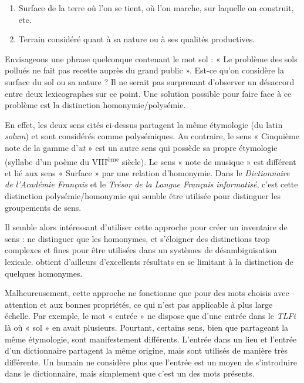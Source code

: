 \begin{enumerate}

  \item Surface de la terre où l'on se tient, où l'on marche, sur laquelle on
      construit, etc.

  \item Terrain considéré quant à sa nature ou à ses qualités productives.

\end{enumerate}

Envisageons une phrase quelconque contenant le mot sol : « Le problème des sols
pollués ne fait pas recette auprès du grand public ». Est-ce qu'on considère la
surface du sol ou sa nature ? Il ne serait pas surprenant d'observer un
désaccord entre deux lexicographes sur ce point. Une solution possible pour
faire face à ce problème est la distinction homonymie/polysémie.

En effet, les deux sens cités ci-dessus partagent la même étymologie (du latin
\textit{solum}) et sont considérés comme polysémiques. Au contraire, le sens «
Cinquième note de la gamme d'\textit{ut} » est un autre sens qui possède sa
propre étymologie (syllabe d'un poème du VIII\textsuperscript{ème} siècle). Le
sens « note de musique » est différent et lié aux sens « Surface » par une
relation d'homonymie. Dans le \textit{Dictionnaire de l'Académie Français} et
le \textit{Trésor de la Langue Français informatisé}, c'est cette distinction
polysémie/homonymie qui semble être utilisée pour distinguer les groupements de
sens.

Il semble alors intéressant d'utiliser cette approche pour créer un inventaire
de sens : ne distinguer que les homonymes, et s'éloigner des distinctions trop
complexes et fines pour être utilisées dans un systèmes de désambiguïsation
lexicale. \cite{yarowsky1995unsupervised} obtient d'ailleurs d'excellents
résultats en se limitant à la distinction de quelques homonymes.

Malheureusement, cette approche ne fonctionne que pour des mots choisis avec
attention et aux bonnes propriétés, ce qui n'est pas applicable à plus large
échelle. Par exemple, le mot « entrée » ne dispose que d'une entrée dans le
\textit{TLFi} là où « sol » en avait plusieurs. Pourtant, certains sens, bien
que partageant la même étymologie, sont manifestement différents. L'entrée dans
un lieu et l'entrée d'un dictionnaire partagent la même origine, mais sont
utilisés de manière très différente. Un humain ne considère plus que l'entrée
est un moyen de s'introduire dans le dictionnaire, mais simplement que c'est un
des mots présents.


